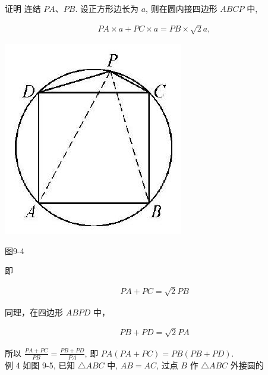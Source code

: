 \documentclass[10pt]{article}
\begin{document}
证明 连结 $P A 、 P B$. 设正方形边长为 $a$, 则在圆内接四边形 $A B C P$ 中,

\begin{align*}
P A \times a+P C \times a=P B \times \sqrt{2} a,
\end{align*}

\begin{center}
\includegraphics[max width=\textwidth]{2024_10_30_66b8e5e701da2093c133g-066}
\end{center}

图9-4

即

\begin{align*}
P A+P C=\sqrt{2} P B
\end{align*}

同理，在四边形 $A B P D$ 中，

\begin{align*}
P B+P D=\sqrt{2} P A
\end{align*}

所以 $\frac{P A+P C}{P B}=\frac{P B+P D}{P A}$, 即 $P A(P A+P C)=P B(P B+P D)$.\\
例 4 如图 9-5, 已知 $\triangle A B C$ 中, $A B=A C$, 过点 $B$ 作 $\triangle A B C$ 外接圆的
\end{document}
